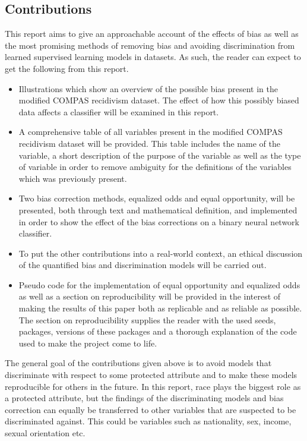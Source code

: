 \documentclass[11pt, fleqn, titlepage]{article}
\begin{document}
	\subsection{Contributions}
	This report aims to give an approachable account of the effects of bias as well as the most promising methods of removing bias and avoiding discrimination from learned supervised learning models in datasets. As such, the reader can expect to get the following from this report.
	
	\begin{itemize}
		\item Illustrations which show an overview of the possible bias present in the modified COMPAS recidivism dataset. The effect of how this possibly biased data affects a classifier will be examined in this report. 
		\item A comprehensive table of all variables present in the modified COMPAS recidivism dataset will be provided. This table includes the name of the variable, a short description of the purpose of the variable as well as the type of variable in order to remove ambiguity for the definitions of the variables which was previously present.
		\item Two bias correction methods, equalized odds and equal opportunity, will be presented, both through text and mathematical definition, and implemented in order to show the effect of the bias corrections on a binary neural network classifier.
		\item To put the other contributions into a real-world context, an ethical discussion of the quantified bias and discrimination models will be carried out.
		\item Pseudo code for the implementation of equal opportunity and equalized odds as well as a section on reproducibility will be provided in the interest of making the results of this paper both as replicable and as reliable as possible. The section on reproducibility supplies the reader with the used seeds, packages, versions of these packages and a thorough explanation of the code used to make the project come to life.
	\end{itemize}
	The general goal of the contributions given above is to avoid models that discriminate with respect to some protected attribute and to make these models reproducible for others in the future. In this report, race plays the biggest role as a protected attribute, but the findings of the discriminating models and bias correction can equally be transferred to other variables that are suspected to be discriminated against. This could be variables such as nationality, sex, income, sexual orientation etc.
	
\end{document}
